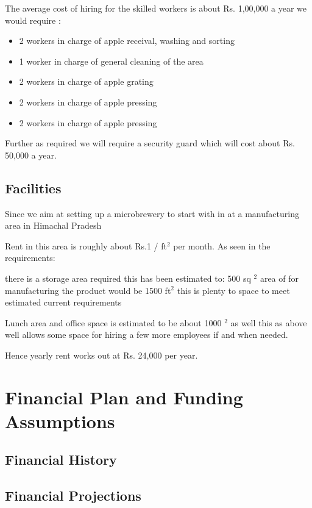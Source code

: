 \documentclass[11pt]{article}
\begin{document}
The average cost of hiring for the skilled workers is about Rs. 1,00,000 a year we would require :
\begin{itemize}

\item 2 workers in charge of apple receival, washing and sorting  
\item 1 worker in charge of general cleaning of the area
\item 2 workers in charge of apple grating
\item 2 workers in charge of apple pressing
\item 2 workers in charge of apple pressing 

\end{itemize}

Further as required we will require a security guard which will cost about Rs. 50,000 a year.
 
  \subsection{Facilities}
Since we aim at setting up a microbrewery to start with in at a manufacturing area in Himachal Pradesh

Rent in this area is roughly about Rs.1 / ft$^2$ per month.
As seen in the requirements:

there is a storage area required this has been estimated to: 500 sq $^2$
area of for manufacturing the product would be 1500 ft$^2$ this is plenty to space to meet estimated current requirements

Lunch area and office space is estimated to be about 1000 $^2$ as well this as above well allows some space for hiring a few more employees if and when needed.

Hence yearly rent works out at Rs. 24,000 per year.
\section{Financial Plan and Funding Assumptions}
  \subsection{Financial History}
  \subsection{Financial Projections}
\end{document}
